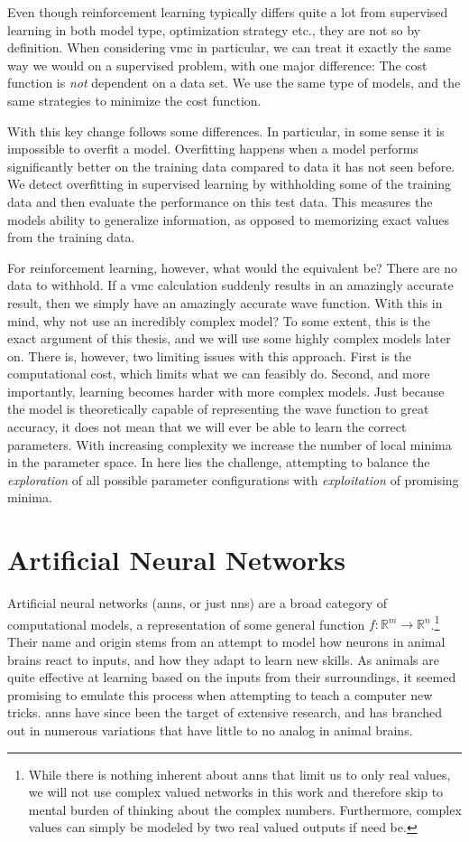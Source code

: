 \documentclass[Thesis.tex]{subfiles}
\begin{document}
Even though reinforcement learning typically differs quite a lot from supervised
learning in both model type, optimization strategy etc., they are not so
by definition. When considering \gls{vmc} in particular, we can treat
it exactly the same way we would on a supervised problem, with one major difference:
The cost function is \emph{not} dependent on a data set. We use the same type
of models, and the same strategies to minimize the cost function.

With this key change follows some differences. In particular, in some sense it
is impossible to overfit a model. Overfitting happens when a model performs
significantly better on the training data compared to data it has not seen
before. We detect overfitting in supervised learning by withholding some of
the training data and then evaluate the performance on this test data. This
measures the models ability to generalize information, as opposed to memorizing
exact values from the training data.

For reinforcement learning, however, what would the equivalent be? There are no
data to withhold. If a \gls{vmc} calculation suddenly results in an amazingly accurate
result, then we simply have an amazingly accurate wave
function. With this in
mind, why not use an incredibly complex model? To some extent, this is the exact
argument of this thesis, and we will use some highly complex models later on.
There is, however, two limiting issues with this approach. First is the
computational cost, which limits what we can feasibly do. Second, and more
importantly, learning becomes harder with more complex models. Just because the
model is theoretically capable of representing the wave function to great
accuracy, it does not mean that we will ever be able to learn the correct
parameters. With increasing complexity we increase the number of local
minima in the parameter space. In here lies the challenge, attempting to balance
the \emph{exploration} of all possible parameter configurations with \emph{exploitation} of
promising minima.


\section{Artificial Neural Networks}
\label{sec:artificial-neural-networks}
Artificial neural networks (\glspl{ann}, or just \glspl{nn}) are a broad category of
computational models, a representation of some general function $f:
\mathbb{R}^m\to\mathbb{R}^n$.\footnote{While there is nothing inherent about
  \glspl{ann} that limit us to only real values, we will not use
  complex valued networks in this work and therefore skip to mental burden of
  thinking about the complex numbers. Furthermore, complex values can simply be
  modeled by two real valued outputs if need be.} Their name and origin stems from an attempt to
model how neurons in animal brains react to inputs, and how they adapt to learn
new skills. As animals are quite effective at learning based on the inputs from
their surroundings, it seemed promising to emulate this
process when attempting to teach a computer new tricks. \Glspl{ann} have since been the
target of extensive research, and has branched out in numerous variations that
have little to no analog in animal brains.
\end{document}
